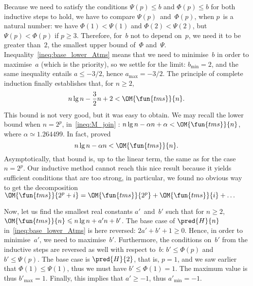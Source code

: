 Because we need to satisfy the conditions \(\Psi(p) \leqslant b\) and
\(\Phi(p) \leqslant b\) for both inductive steps to hold, we have to
compare \(\Psi(p)\)~and~\(\Phi(p)\), when \(p\)~is a natural number:
we have \(\Phi(1) < \Psi(1)\) and \(\Phi(2) < \Psi(2)\), but \(\Psi(p)
< \Phi(p)\) if \(p \geqslant 3\). Therefore, for~\(b\) not to depend
on~\(p\), we need it to be greater than~\(2\), the smallest upper
bound of~\(\Phi\)
and~\(\Psi\). Inequality~\eqref{ineq:base_lower_Atms} means that we
need to minimise~\(b\) in order to maximise~\(a\) (which is the
priority), so we settle for the limit: \(b_{\min} = 2\), and the same
inequality entails \(a \leqslant -3/2\), hence \(a_{\max} =
-3/2\). The principle of complete induction finally establishes that,
for \(n \geqslant 2\),
\begin{equation}
  n\lg n - \frac{3}{2} n + 2 < \OM{\fun{tms}}{n}.
\label{ineq:lower_Atms}
\end{equation}
This bound is not very good, but it was easy to obtain. We may recall
the lower bound when \(n=2^p\), in~\eqref{ineq:M_join}
: \(n\lg n - \alpha n + \alpha <
\OM{\fun{tms}}{n}\), where \(\alpha \simeq 1.264499\). In fact,
\cite{FlajoletGolin_1994} proved
\begin{equation}
n\lg n - \alpha n < \OM{\fun{tms}}{n}.
\label{ineq:best_lower_Atms}
\end{equation}
Asymptotically, that bound is, up to the linear term, the same as for
the case \(n=2^p\). Our inductive method cannot reach this nice result
because it yields sufficient conditions that are too strong, in
particular, we found no obvious way to get the decomposition
\(\OM{\fun{tms}}{2^p+i} = \OM{\fun{tms}}{2^p} + \OM{\fun{tms}}{i} +
\dots\)

Now, let us find the smallest real constants \(a'\)~and~\(b'\) such
that for \(n \geqslant 2\), \(\OM{\fun{tms}}{n} \leqslant n\lg n + a'n
+ b'\). The base case of \(\pred{H}{n}\)
in~\eqref{ineq:base_lower_Atms} is here reversed: \(2a' + b' + 1
\geqslant 0\). Hence, in order to minimise~\(a'\), we need to
maximise~\(b'\). Furthermore, the conditions on~\(b'\) from the
inductive steps are reversed as well with respect to~\(b\): \(b'
\leqslant \Phi(p)\) and \(b' \leqslant \Psi(p)\). The base case is
\(\pred{H}{2}\), that is, \(p=1\), and we saw earlier that \(\Phi(1)
\leqslant \Psi(1)\), thus we must have \(b'\leqslant \Phi(1) =
1\). The maximum value is thus \(b'_{\max} = 1\). Finally, this
implies that \(a'\geqslant -1\), thus \(a'_{\min} = -1\).

